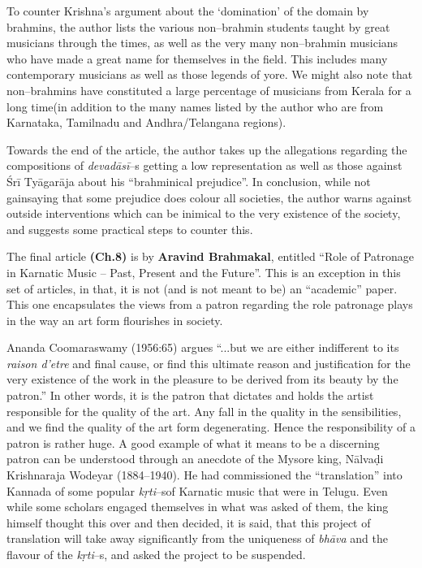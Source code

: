 To counter Krishna’s argument about the ‘domination’ of the domain by brahmins, the author lists the various non–brahmin students taught by great musicians through the times, as well as the very many non–brahmin musicians who have made a great name for themselves in the field. This includes many contemporary musicians as well as those legends of yore. We might also note that non–brahmins have constituted a large percentage of musicians from Kerala for a long time(in addition to the many names listed by the author who are from Karnataka, Tamilnadu and Andhra/Telangana regions).

Towards the end of the article, the author takes up the allegations regarding the compositions of \textit{devadāsī}–s getting a low representation as well as those against Śrī Tyāgarāja about his “brahminical prejudice”. In conclusion, while not gainsaying that some prejudice does colour all societies, the author warns against outside interventions which can be inimical to the very existence of the society, and suggests some practical steps to counter this.

The final article \textbf{(Ch.8)} is by \textbf{Aravind Brahmakal}, entitled “Role of Patronage in Karnatic Music – Past, Present and the Future”. This is an exception in this set of articles, in that, it is not (and is not meant to be) an “academic” paper. This one encapsulates the views from a patron regarding the role patronage plays in the way an art form flourishes in society.

\newpage

Ananda Coomaraswamy (1956:65) argues “...but we are either indifferent to its \textit{raison d'etre} and final cause, or find this ultimate reason and justification for the very existence of the work in the pleasure to be derived from its beauty by the patron.” In other words, it is the patron that dictates and holds the artist responsible for the quality of the art. Any fall in the quality in the sensibilities, and we find the quality of the art form degenerating. Hence the responsibility of a patron is rather huge. A good example of what it means to be a discerning patron can be understood through an anecdote of the Mysore king, Nālvaḍi Krishnaraja Wodeyar (1884–1940). He had commissioned the “translation” into Kannada of some popular \textit{kṛti}–s\break of Karnatic music that were in Telugu. Even while some scholars engaged themselves in what was asked of them, the king himself thought this over and then decided, it is said, that this project of translation will take away significantly from the uniqueness of \textit{bhāva} and the flavour of the \textit{kṛti}–s, and asked the project to be suspended.

